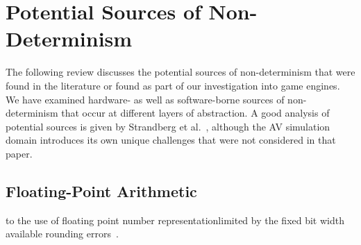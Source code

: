 \section{Potential Sources of Non-Determinism} \label{s:nondeterminisimSources}

The following review discusses the potential sources of non-determinism that were found in the literature or found as part of our investigation into game engines. We have examined hardware- as well as software-borne sources of non-determinism that occur at different layers of abstraction. 
%
A good analysis of potential sources is given by Strandberg et al.~\cite{intermittently-failing-tests}, although the AV simulation domain introduces its own unique challenges that were not considered in that paper.

\medskip


\subsection{Floating-Point Arithmetic}


\DIFdelbegin {}\DIFdelend %
\DIFaddbegin {}\DIFaddend to \DIFaddbegin {}\DIFaddend the use of floating point number representation\DIFdelbegin {}\DIFdelend \DIFaddbegin {}\DIFaddend limited by the fixed bit width available \DIFdelbegin {}\DIFdelend \DIFaddbegin {}\DIFaddend rounding errors~\cite{FloatingPointsBook,goldberg1991every}. %
\DIFdelbegin %

